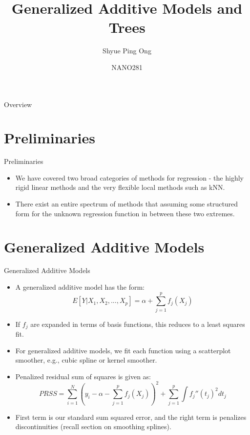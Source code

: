 \documentclass[aspectratio=169]{beamer}
\title[Generalized Additive Models and Trees]{Generalized Additive Models and Trees}
\author{Shyue Ping Ong}
\institute[UCSD]{University of California, San Diego\\
\medskip
}
\date{NANO281} %
\begin{document}
\begin{frame}
    \titlepage %
\end{frame}


\begin{frame}{Overview}
    \tableofcontents
\end{frame}


\section{Preliminaries}

\begin{frame}{Preliminaries}
    \begin{itemize}
        \item We have covered two broad categories of methods for regression - the highly rigid linear methods and the very flexible local methods such as kNN. 
        \item There exist an entire spectrum of methods that assuming some structured form for the unknown regression function in between these two extremes.
    \end{itemize}
\end{frame}

\section{Generalized Additive Models}

\begin{frame}{Generalized Additive Models}
    \begin{itemize}
        \item A generalized additive model has the form:
        \begin{equation*}
            E[Y|X_1, X_2, ..., X_p] = \alpha + \sum_{j=1}^p f_j(X_j)
        \end{equation*}
        \item If $f_j$ are expanded in terms of basis functions, this reduces to a least squares fit. 
        \item For generalized additive models, we fit each function using a scatterplot smoother, e.g., cubic spline or kernel smoother.
        \item Penalized residual sum of squares is given as:
        \begin{equation*}
            PRSS = \sum_{i=1}^N \left( y_i - \alpha - \sum_{j=1}^p f_j(X_j) \right)^2 + \sum_{j=1}^p \int f_j''(t_j)^2 dt_j
        \end{equation*}
        \item First term is our standard sum squared error, and the right term is penalizes discontinuities (recall section on smoothing splines).
    \end{itemize}
\end{frame}
\end{document}
